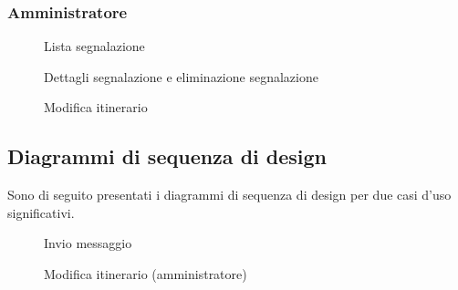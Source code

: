 \documentclass{natourDoc}
\begin{document}
\newpage

\subsubsection{Amministratore}
\begin{figure}[!htbp]
	\centering
	
	\caption{Lista segnalazione}
\end{figure}
\FloatBarrier

\begin{figure}[!htbp]
	\centering
	
	\caption{Dettagli segnalazione e eliminazione segnalazione}
\end{figure}
\FloatBarrier

\begin{figure}[!htbp]
	\centering
	
	\caption{Modifica itinerario}
\end{figure}
\FloatBarrier

\newpage
\subsection{Diagrammi di sequenza di design}
Sono di seguito presentati i diagrammi di sequenza di design per due casi d'uso significativi.

\begin{figure}[!htbp]
	\centering
	
	\caption{Invio messaggio}
\end{figure}
\FloatBarrier

\newpage

\begin{figure}[!htbp]
	\centering
	
	\caption{Modifica itinerario (amministratore)}
\end{figure}
\FloatBarrier

\newpage
\end{document}
